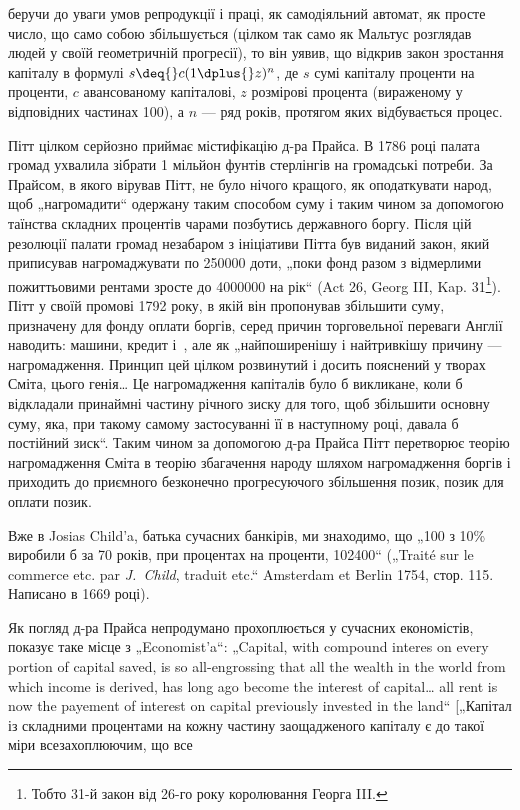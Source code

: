 \parcont{}  %
беручи до уваги умов репродукції і праці, як самодіяльний
автомат, як просте число, що само собою збільшується (цілком
так само як Мальтус розглядав людей у своїй геометричній
прогресії), то він уявив, що відкрив закон зростання капіталу
в формулі $s \deq{} c (1 \dplus{} z)^n$, де $s$ \deq{} сумі капіталу \dplus{} проценти на
проценти, $c$ \deq{} авансованому капіталові, $z$ \deq{} розмірові процента
(вираженому у відповідних частинах 100), а $n$ — ряд років, протягом
яких відбувається процес.

Пітт цілком серйозно приймає містифікацію д-ра Прайса.
В 1786 році палата громад ухвалила зібрати 1 мільйон фунтів стерлінгів
на громадські потреби. За Прайсом, в якого вірував Пітт,
не було нічого кращого, як оподаткувати народ, щоб „нагромадити“
одержану таким способом суму і таким чином за допомогою
таїнства складних процентів чарами позбутись державного
боргу. Після цій резолюції палати громад незабаром з ініціативи
Пітта був виданий закон, який приписував нагромаджувати по
\num{250000} доти, „поки фонд разом з відмерлими
пожиттьовими рентами зросте до \num{4000000}
на рік“ (Act 26, Georg III, Kap. 31\footnote*{
Тобто 31-й закон від 26-го року королювання Георга III.
}). Пітт у своїй промові 1792 року,
в якій він пропонував збільшити суму, призначену для фонду
оплати боргів, серед причин торговельної переваги Англії наводить:
машини, кредит і~, але як „найпоширенішу і найтривкішу
причину — нагромадження. Принцип цей цілком розвинутий
і досить пояснений у творах Сміта, цього генія\dots{} Це нагромадження
капіталів було б викликане, коли б відкладали принаймні
частину річного зиску для того, щоб збільшити основну
суму, яка, при такому самому застосуванні її в наступному році,
давала б постійний зиск“. Таким чином за допомогою д-ра Прайса
Пітт перетворює теорію нагромадження Сміта в теорію збагачення
народу шляхом нагромадження боргів і приходить до
приємного безконечно прогресуючого збільшення позик, позик
для оплати позик.

Вже в Josias Child’a, батька сучасних банкірів, ми знаходимо,
що „100 з 10\% виробили б за 70 років, при
процентах на проценти, \num{102400}“ („Traité sur le
commerce etc. par \emph{J.~Child}, traduit etc.“ Amsterdam et Berlin
1754, стор. 115. Написано в 1669 році).

Як погляд д-ра Прайса непродумано прохоплюється у сучасних
економістів, показує таке місце з „Economist’a“: „Capital,
with compound interes on every portion of capital saved, is so
all-engrossing that all the wealth in the world from which income
is derived, has long ago become the interest of capital\dots{} all rent is
now the payement of interest on capital previously invested in the
land“ [„Капітал із складними процентами на кожну частину заощадженого
капіталу є до такої міри всезахоплюючим, що все
\parbreak{}  %
